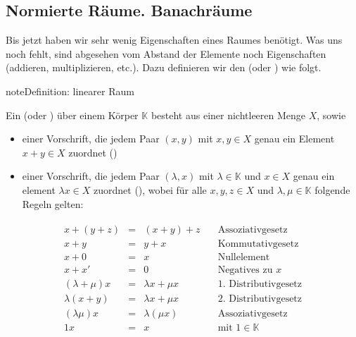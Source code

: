 \documentclass[letterpaper,10pt,english]{jupyterBook}
\begin{document}
\subsection{Normierte Räume. Banachräume}
\label{\detokenize{Funktionalanalysis/Funktionalanalysis:normierte-raume-banachraume}}
Bis jetzt haben wir sehr wenig Eigenschaften eines Raumes benötigt. Was uns noch fehlt, sind abgesehen vom Abstand der Elemente noch  Eigenschaften (addieren, multiplizieren, etc.). Dazu definieren wir den  (oder ) wie folgt.

\begin{sphinxadmonition}{note}{Definition: linearer Raum}

Ein  (oder ) über einem Körper \(\mathbb{K}\) besteht aus einer nichtleeren Menge \(X\), sowie
\begin{itemize}
\item {} 
einer Vorschrift, die jedem Paar \((x,y)\) mit \(x,y \in X\) genau ein Element \(x+y\in X\) zuordnet ()

\item {} 
einer Vorschrift, die jedem Paar \((\lambda,x)\) mit \(\lambda\in \mathbb{K}\) und \(x \in X\) genau ein element \(\lambda x\in X\) zuordnet (), wobei für alle \(x,y,z \in X\) und \(\lambda, \mu\in\mathbb{K}\) folgende Regeln gelten:

\end{itemize}
\begin{equation*}
\begin{split}\begin{array}{rcll}
x + (y+z) & = & (x+y) + z & \quad\text{Assoziativgesetz} \\
x + y & = & y + x & \quad\text{Kommutativgesetz} \\
x + 0 & = & x & \quad\text{Nullelement} \\
x + x' & = & 0 & \quad\text{Negatives zu $x$}\\
(\lambda + \mu) x & = &  \lambda x + \mu x & \quad\text{1. Distributivgesetz}\\
\lambda (x+y) & = &  \lambda x + \mu x & \quad\text{2. Distributivgesetz}\\
(\lambda \mu) x & = & \lambda (\mu x) & \quad\text{Assoziativgesetz}\\
1 x & = & x & \quad\text{mit $1\in\mathbb{K}$}
\end{array}\end{split}
\end{equation*}\end{sphinxadmonition}
\end{document}
